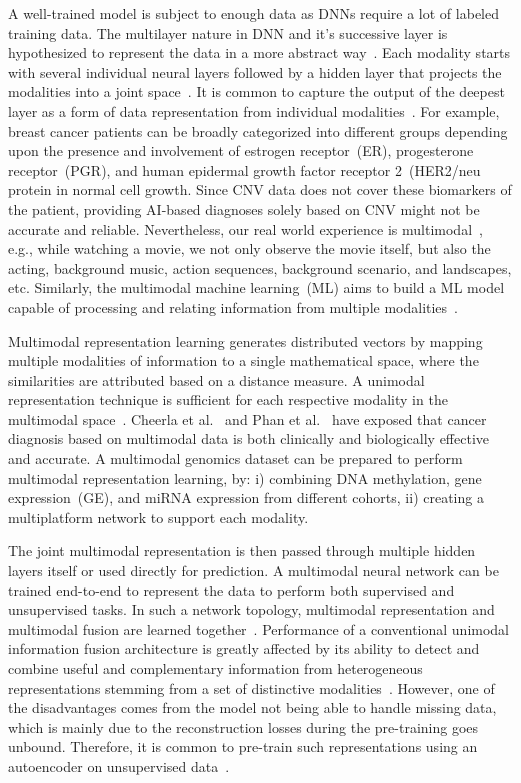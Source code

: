 \hspace*{3.5mm} A well-trained model is subject to enough data as DNNs require a lot of labeled training data. The multilayer nature in DNN and it's successive layer is hypothesized to represent the data in a more abstract way~\cite{mmsurvey}. Each modality starts with several individual neural layers followed by a hidden layer that projects the modalities into a joint space~\cite{serban2016multi}. It is common to capture the output of the deepest layer as a form of data representation from individual modalities~\cite{mmsurvey,serban2016multi}. For example, breast cancer patients can be broadly categorized into different groups depending upon the presence and involvement of estrogen receptor~(ER), progesterone receptor~(PGR), and human epidermal growth factor receptor 2~(HER2/neu protein in normal cell growth. Since CNV data does not cover these biomarkers of the patient, providing AI-based diagnoses solely based on CNV might not be accurate and reliable. Nevertheless, our real world experience is multimodal~\cite{mmsurvey}, e.g., while watching a movie, we not only observe the movie itself, but also the acting, background music, action sequences, background scenario, and landscapes, etc. Similarly, the multimodal machine learning~(ML) aims to build a ML model capable of processing and relating information from multiple modalities~\cite{mmsurvey}. 

\hspace*{3.5mm} Multimodal representation learning generates distributed vectors by mapping multiple modalities of information to a single mathematical space, where the similarities are attributed based on a distance measure. A unimodal representation technique is sufficient for each respective modality in the multimodal space~\cite{ito2018effects}. Cheerla et al.~\cite{cheerla2019deep} and Phan et al.~\cite{phan2016integration} have exposed that cancer diagnosis based on multimodal data is both clinically and biologically effective and accurate. A multimodal genomics dataset can be prepared to perform multimodal representation learning, by: i) combining DNA methylation, gene expression~(GE), and miRNA expression from different cohorts, ii) creating a multiplatform network to support each modality. 

\hspace*{3.5mm} The joint multimodal representation is then passed through multiple hidden layers itself or used directly for prediction. A multimodal neural network can be trained end-to-end to represent the data to perform both supervised and unsupervised tasks. In such a network topology, multimodal representation and multimodal fusion are learned together~\cite{wang2018associativemulti}. Performance of a conventional unimodal information fusion architecture is greatly affected by its ability to detect and combine useful and complementary information from heterogeneous representations stemming from a set of distinctive modalities~\cite{ito2018effects}. However, one of the disadvantages comes from the model not being able to handle missing data, which is mainly due to the reconstruction losses during the pre-training goes unbound. Therefore, it is common to pre-train such representations using an autoencoder on unsupervised data~\cite{mmsurvey}. 

